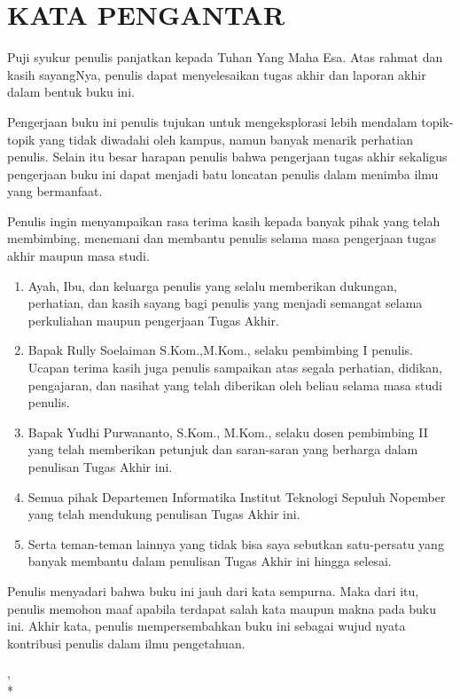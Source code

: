 \chapter {KATA PENGANTAR}

Puji syukur penulis panjatkan kepada Tuhan Yang Maha Esa. Atas rahmat dan kasih sayangNya, penulis dapat menyelesaikan tugas akhir dan laporan akhir dalam bentuk buku ini.

Pengerjaan buku ini penulis tujukan untuk mengeksplorasi lebih mendalam topik-topik yang tidak diwadahi oleh kampus, namun banyak menarik perhatian penulis. Selain itu besar harapan penulis bahwa pengerjaan tugas akhir sekaligus pengerjaan buku ini dapat menjadi batu loncatan penulis dalam menimba ilmu yang bermanfaat.

Penulis ingin menyampaikan rasa terima kasih kepada banyak pihak yang telah membimbing, menemani dan membantu penulis selama masa pengerjaan tugas akhir maupun masa studi.

\begin {enumerate}
	\item Ayah, Ibu, dan keluarga penulis yang selalu memberikan dukungan, perhatian, dan kasih sayang bagi penulis yang menjadi semangat selama perkuliahan maupun pengerjaan Tugas Akhir.
	\item Bapak Rully Soelaiman S.Kom.,M.Kom., selaku pembimbing I penulis. Ucapan terima kasih juga penulis sampaikan atas segala perhatian, didikan, pengajaran, dan nasihat yang telah diberikan oleh beliau selama masa studi penulis.
	\item Bapak Yudhi Purwananto, S.Kom., M.Kom., selaku dosen pembimbing II yang telah memberikan petunjuk dan saran-saran yang berharga dalam penulisan Tugas Akhir ini.
	\item Semua pihak Departemen Informatika Institut Teknologi Sepuluh Nopember yang telah mendukung penulisan Tugas Akhir ini.
	\item Serta teman-teman lainnya yang tidak bisa saya sebutkan satu-persatu yang banyak membantu dalam penulisan Tugas Akhir ini hingga selesai.
\end {enumerate}

Penulis menyadari bahwa buku ini jauh dari kata sempurna. Maka dari itu, penulis memohon maaf apabila terdapat salah kata maupun makna pada buku ini. Akhir kata, penulis mempersembahkan buku ini sebagai wujud nyata kontribusi penulis dalam ilmu pengetahuan.

\begin{flushright}
\lokasi, \tanggal \\*
\vspace{5em}
\penulis
\end{flushright}